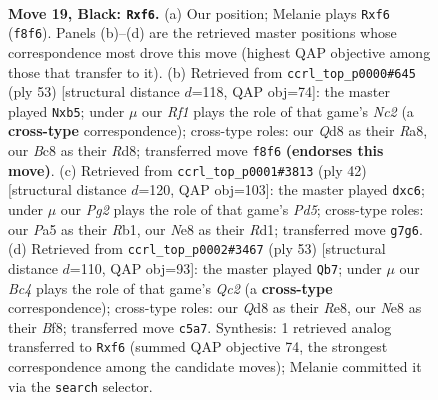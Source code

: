 \documentclass[11pt]{article}
\begin{document}
\clearpage

\begin{figure}[p]\centering
\begin{subfigure}{0.46\textwidth}\centering
\resizebox{\linewidth}{!}{%
\newchessgame
\chessboard[
  setfen={rnbqnrk1/1p4pp/5P2/p1b2p1P/P1PN3R/6P1/6B1/RNBQ2K1 b - - 0 19},
  showmover=false,
  pgfstyle=straightmove, color=movearrow, markmove={f8-f6}
]}
\caption{}
\end{subfigure}\hfill
\begin{subfigure}{0.46\textwidth}\centering
\resizebox{\linewidth}{!}{%
\newchessgame
\chessboard[
  setfen={r2r2k1/2nbqn1p/2pp2p1/1P3p2/NP3P2/4P1PP/2QN2B1/R3R1K1 b - - 0 27},
  showmover=false,
  pgfstyle=straightmove, color=movearrow, markmove={c7-b5}
]}
\caption{}
\end{subfigure}
\\[4pt]
\begin{subfigure}{0.46\textwidth}\centering
\resizebox{\linewidth}{!}{%
\newchessgame
\chessboard[
  setfen={r1b1r1k1/1p3pbp/2p3p1/3P4/1q2n3/1P2B1PP/2Q1NPB1/1R1R2K1 w - - 0 22},
  showmover=false,
  pgfstyle=straightmove, color=movearrow, markmove={d5-c6}
]}
\caption{}
\end{subfigure}\hfill
\begin{subfigure}{0.46\textwidth}\centering
\resizebox{\linewidth}{!}{%
\newchessgame
\chessboard[
  setfen={b2rrbk1/2q2pp1/2p2n1p/1p2N3/1P1P1Q2/7P/2B2PP1/1RB1R1K1 b - - 2 27},
  showmover=false,
  pgfstyle=straightmove, color=movearrow, markmove={c7-b7}
]}
\caption{}
\end{subfigure}
\caption{\textbf{Move 19, Black: \texttt{Rxf6}.} (a) Our position; Melanie plays \texttt{Rxf6} (\texttt{f8f6}). Panels (b)--(d) are the retrieved master positions whose correspondence most drove this move (highest QAP objective among those that transfer to it). (b) Retrieved from \texttt{ccrl\_top\_p0000\#645} (ply 53) [structural distance $d$=118, QAP obj=74]: the master played \texttt{Nxb5}; under $\mu$ our \emph{Rf1} plays the role of that game's \emph{Nc2} (a \textbf{cross-type} correspondence); cross-type roles: our \emph{Q}d8 as their \emph{R}a8, our \emph{B}c8 as their \emph{R}d8; transferred move \texttt{f8f6} \textbf{(endorses this move)}. (c) Retrieved from \texttt{ccrl\_top\_p0001\#3813} (ply 42) [structural distance $d$=120, QAP obj=103]: the master played \texttt{dxc6}; under $\mu$ our \emph{Pg2} plays the role of that game's \emph{Pd5}; cross-type roles: our \emph{P}a5 as their \emph{R}b1, our \emph{N}e8 as their \emph{R}d1; transferred move \texttt{g7g6}. (d) Retrieved from \texttt{ccrl\_top\_p0002\#3467} (ply 53) [structural distance $d$=110, QAP obj=93]: the master played \texttt{Qb7}; under $\mu$ our \emph{Bc4} plays the role of that game's \emph{Qc2} (a \textbf{cross-type} correspondence); cross-type roles: our \emph{Q}d8 as their \emph{R}e8, our \emph{N}e8 as their \emph{B}f8; transferred move \texttt{c5a7}. Synthesis: 1 retrieved analog transferred to \texttt{Rxf6} (summed QAP objective 74, the strongest correspondence among the candidate moves); Melanie committed it via the \texttt{search} selector.}
\label{fig:thought-m37}
\end{figure}
\end{document}
